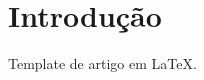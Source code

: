 \documentclass[12pt,a4paper]{article}
\begin{document}
\maketitle
\tableofcontents

\section{Introdução}
    Template de artigo em \LaTeX.
    
\end{document}

